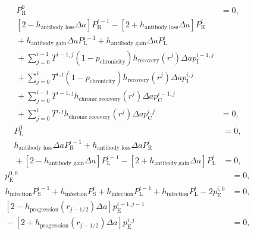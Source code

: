 \documentclass[12pt]{article}
\begin{document}
\begin{equation}
  \begin{split}
    P_{\mathrm{R}}^0 &= 0,
    \\
    \left[2 - h_{\text{antibody loss}} \Delta a\right]
    P_{\mathrm{R}}^{i - 1}
    - \left[2 + h_{\text{antibody loss}} \Delta a\right]
    P_{\mathrm{R}}^i
    \\ {}
    + h_{\text{antibody gain}} \Delta a P_{\mathrm{L}}^{i - 1}
    + h_{\text{antibody gain}} \Delta a P_{\mathrm{L}}^i
    \\ {}
    + \sum_{j = 0}^{i - 1}
    T^{i - 1, j} \left(1 - p_{\text{chronicity}}\right)
    h_{\text{recovery}}(r^j) \Delta a
    p_{\mathrm{I}}^{i - 1, j}
    \\ {}
    + \sum_{j = 0}^i
    T^{i, j} \left(1 - p_{\text{chronicity}}\right)
    h_{\text{recovery}}(r^j) \Delta a
    p_{\mathrm{I}}^{i, j}
    \\ {}
    + \sum_{j = 0}^{i - 1}
    T^{i - 1, j} h_{\text{chronic recovery}}(r^j) \Delta a
    p_{\mathrm{C}}^{i - 1, j}
    \\ {}
    + \sum_{j = 0}^i
    T^{i, j} h_{\text{chronic recovery}}(r^j) \Delta a
    p_{\mathrm{C}}^{i, j}
    &= 0,
  \end{split}
\end{equation}
\begin{equation}
  \begin{split}
    P_{\mathrm{L}}^0 &= 0,
    \\
    h_{\text{antibody loss}} \Delta a P_{\mathrm{R}}^{i - 1}
    + h_{\text{antibody loss}} \Delta a P_{\mathrm{R}}^i
    \\ {}
    + \left[2 - h_{\text{antibody gain}} \Delta a\right]
    P_{\mathrm{L}}^{i - 1}
    - \left[2 + h_{\text{antibody gain}} \Delta a\right]
    P_{\mathrm{L}}^i
    &= 0,
  \end{split}
\end{equation}
\begin{equation}
  \begin{split}
    p_{\mathrm{E}}^{0, 0} &= 0,
    \\
    h_{\text{infection}} P_{\mathrm{S}}^{i - 1}
    + h_{\text{infection}} P_{\mathrm{S}}^i
    + h_{\text{infection}} P_{\mathrm{L}}^{i - 1}
    + h_{\text{infection}} P_{\mathrm{L}}^i
    - 2 p_{\mathrm{E}}^{i, 0}
    &= 0,
    \\
    \left[2 - h_{\text{progression}}(r_{j - 1 / 2}) \Delta a\right]
    p_{\mathrm{E}}^{i - 1, j - 1}
    \\ {}
    - \left[2 + h_{\text{progression}}(r_{j - 1 / 2}) \Delta a\right]
    p_{\mathrm{E}}^{i, j}
    &= 0,
  \end{split}
\end{equation}
\end{document}
